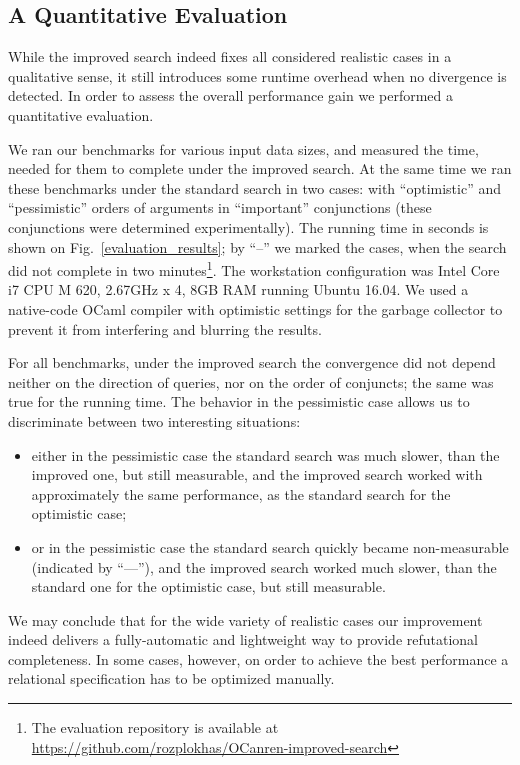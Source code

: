 \subsection{A Quantitative Evaluation}



While the improved search indeed fixes all considered realistic cases in a qualitative sense, it still introduces some runtime
overhead when no divergence is detected. In order to assess the overall performance gain we performed a quantitative
evaluation.

We ran our benchmarks for various input data sizes, and measured the time, needed for them to complete under the improved search. At the same time
we ran these benchmarks under the standard search in two cases: with ``optimistic'' and ``pessimistic'' orders of arguments in ``important'' conjunctions
(these conjunctions were determined experimentally). The running time in seconds is shown on Fig.~\ref{evaluation_results}; by
``--'' we marked the cases, when the search did not complete in two minutes\footnote{The evaluation repository is available at \url{https://github.com/rozplokhas/OCanren-improved-search}}.
The workstation configuration was Intel Core i7 CPU M 620, 2.67GHz x 4, 8GB RAM running Ubuntu 16.04. We used a native-code OCaml compiler with
optimistic settings for the garbage collector to prevent it from interfering and blurring the results.

For all benchmarks, under the improved search the convergence did not depend neither on the direction of queries, nor on the order of conjuncts; the same was true for
the running time. The behavior in the pessimistic case allows us to discriminate between two interesting situations:

\begin{itemize}
\item either in the pessimistic case the standard search was much slower, than the improved one, but still measurable, and the improved search worked with approximately the
same performance, as the standard search for the optimistic case;
  
\item or in the pessimistic case the standard search quickly became non-measurable (indicated by ``---''), and the improved search worked much slower, than the standard one for the
optimistic case, but still measurable.
\end{itemize}

We may conclude that for the wide variety of realistic cases our improvement indeed delivers a fully-automatic and lightweight way to provide refutational completeness. In some cases,
however, on order to achieve the best performance a relational specification has to be optimized manually.

